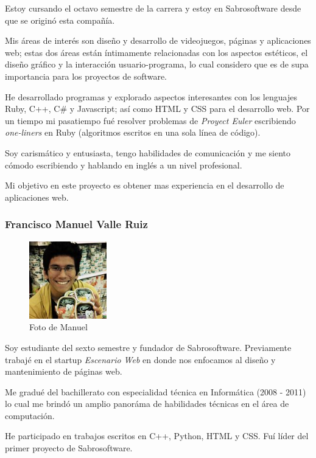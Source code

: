 \documentclass[letterpaper]{article}
\begin{document}
Estoy cursando el octavo semestre de la carrera y estoy en Sabrosoftware desde que se originó esta compañía.

Mis áreas de interés son diseño y desarrollo de videojuegos, páginas y aplicaciones web; estas dos áreas están íntimamente relacionadas con los aspectos estéticos, el diseño gráfico y la interacción usuario-programa, lo cual considero que es de supa importancia para los proyectos de software.

He desarrollado programas y explorado aspectos interesantes con los lenguajes Ruby, C++, C\# y Javascript; así como HTML y CSS para el desarrollo web. Por un tiempo mi pasatiempo fué resolver problemas de \emph{Proyect Euler} escribiendo \emph{one-liners} en Ruby (algoritmos escritos en una sola línea de código).

Soy carismático y entusiasta, tengo habilidades de comunicación y me siento cómodo escribiendo y hablando en inglés a un nivel profesional.

Mi objetivo en este proyecto es obtener mas experiencia en el desarrollo de aplicaciones web.

\subsubsection*{Francisco Manuel Valle Ruiz}

\begin{figure}[h!]
  \centering
    \includegraphics[width=0.3\textwidth]{Manuel}
    \caption{Foto de Manuel}
\end{figure}

Soy estudiante del sexto semestre y fundador de Sabrosoftware. Previamente trabajé en el startup \emph{Escenario Web} en donde nos enfocamos al diseño y mantenimiento de páginas web.

Me gradué del bachillerato con especialidad técnica en Informática (2008 - 2011) lo cual me brindó un amplio panoráma de habilidades técnicas en el área de computación.

He participado en trabajos escritos en C++, Python, HTML y CSS. Fuí líder del primer proyecto de Sabrosoftware.
\end{document}
